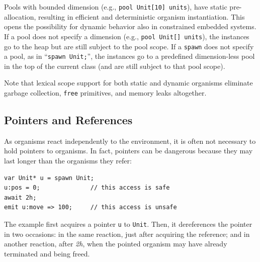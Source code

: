 \documentclass{acm_proc_article-sp}
\newcommand{\code}[1] {{\small{\texttt{#1}}}}
\newcommand{\1}{\;}
\newcommand{\2}{\;\;}
\newcommand{\3}{\;\;\;}
\newcommand{\5}{\;\;\;\;\;}
\begin{document}
Pools with bounded dimension (e.g., \code{pool Unit[10] units}), have static 
pre-allocation, resulting in efficient and deterministic organism 
instantiation.
This opens the possibility for dynamic behavior also in constrained embedded 
systems.
%
If a pool does not specify a dimension (e.g., \code{pool Unit[] units}), the 
instances go to the heap but are still subject to the pool scope.
%
If a \code{spawn} does not specify a pool, as in ``\code{spawn Unit;}'', the 
instances go to a predefined dimension-less pool in the top of the current 
class (and are still subject to that pool scope).

Note that lexical scope support for both static and dynamic organisms eliminate 
garbage collection, \code{free} primitives, and memory leaks altogether.

\subsection{Pointers and References}
\label{sec.orgs.refs}

As organisms react independently to the environment, it is often not necessary 
to hold pointers to organisms.
%
In fact, pointers can be dangerous because they may last longer than the 
organisms they refer:

\begin{lstlisting}
var Unit* u = spawn Unit;
u:pos = 0;              // this access is safe
await 2h;
emit u:move => 100;     // this access is unsafe
\end{lstlisting}

The example first acquires a pointer \code{u} to \code{Unit}.
Then, it dereferences the pointer in two occasions:
in the same reaction, just after acquiring the reference;
and in another reaction, after \emph{2h}, when the pointed organism may have 
already terminated and being freed.
\end{document}
